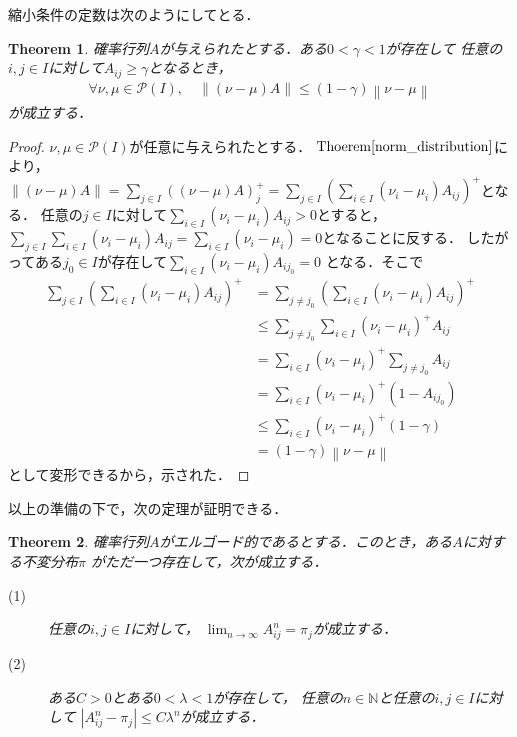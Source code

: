\documentclass[dvipdfmx,autodetect-engine]{jsarticle}
\newtheorem{theorem}{Theorem}[section]
\theoremstyle{remark}
\theoremstyle{definition}
\newcommand{\N}{\mathbb{N}}
\newcommand{\abs}[1]{\left\lvert#1\right\rvert}%
\newcommand{\norm}[1]{\left\lVert#1\right\rVert}%
\begin{document}
縮小条件の定数は次のようにしてとる．


\begin{theorem}\label{contraction_ergodic}
    確率行列$A$が与えられたとする．ある$0 <\gamma<1$が存在して
    任意の$i,j \in I$に対して$A_{ij} \geq \gamma$となるとき，
    \begin{align}
        \forall \nu,\mu \in \mathcal{P}(I),\quad 
        \norm{(\nu -\mu)A} \leq (1-\gamma)\norm{\nu-\mu}
    \end{align}
    が成立する．
\end{theorem}


\begin{proof}
    $\nu,\mu \in \mathcal{P}(I)$が任意に与えられたとする．
    $\mathrm{Thoerem}\ref{norm_distribution}$により，
    $\norm{(\nu -\mu)A} = \sum_{j \in I} \left((\nu - \mu)A\right)_{j}^{+}
    = \sum_{j \in I} \left(\sum_{i \in I} (\nu_{i} - \mu_{i})A_{ij}\right)^{+}$となる．
    任意の$j \in I$に対して$\sum_{i \in I}(\nu_{i}-\mu_{i})A_{ij}>0$とすると，
    $\sum_{j \in I}\sum_{i \in I} (\nu_{i}-\mu_{i})A_{ij} = 
    \sum_{i \in I} (\nu_{i} - \mu_{i}) = 0$となることに反する．
    したがってある$j_0 \in I$が存在して$\sum_{i \in I}(\nu_{i}-\mu_{i})A_{ij_{0}}=0$
    となる．そこで
    \begin{align}
        \sum_{j \in I} \left(\sum_{i \in I} (\nu_{i} - \mu_{i})A_{ij}\right)^{+} 
        &=\sum_{j \neq j_0} \left(\sum_{i \in I} (\nu_{i} - \mu_{i})A_{ij}\right)^{+} \\
        &\leq \sum_{j \neq j_0} \sum_{i \in I} (\nu_{i} - \mu_{i})^{+} A_{ij} \\
        &= \sum_{i \in I} (\nu_{i} - \mu_{i})^{+} \sum_{j \neq j_0} A_{ij} \\
        &= \sum_{i \in I} (\nu_{i} - \mu_{i})^{+} (1-A_{ij_{0}})\\
        &\leq \sum_{i \in I} (\nu_{i} - \mu_{i})^{+} (1-\gamma)\\
        &= (1-\gamma)\norm{\nu-\mu}
    \end{align}
    として変形できるから，示された．
\end{proof}


以上の準備の下で，次の定理が証明できる．


\begin{theorem}
    確率行列$A$がエルゴード的であるとする．このとき，ある$A$に対する不変分布$\pi$
    がただ一つ存在して，次が成立する．
    \begin{description}
        \item[(1)] 任意の$i,j \in I$に対して，
        $\lim_{n \to \infty} A_{ij}^n = \pi_j$が成立する．
        \item[(2)] ある$C>0$とある$0<\lambda < 1$が存在して，
        任意の$n \in \N$と任意の$i,j \in I$に対して
        $\abs{A_{ij}^n - \pi_{j}} \leq C\lambda^{n}$が成立する．
    \end{description}
\end{theorem}
\end{document}
